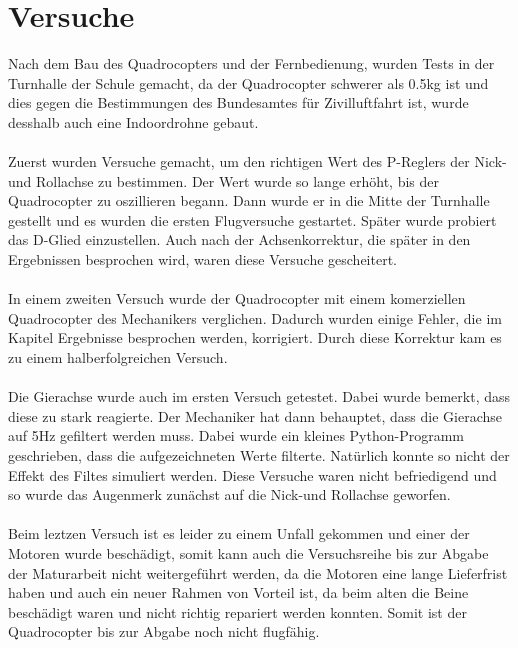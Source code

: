 \documentclass[12pt,a4paper, ngerman]{article}
\begin{document}
\section{Versuche}
Nach dem Bau des Quadrocopters und der Fernbedienung, wurden Tests in der Turnhalle der Schule gemacht, da der Quadrocopter schwerer als 0.5kg ist und dies gegen die Bestimmungen des Bundesamtes für Zivilluftfahrt ist, wurde desshalb auch eine Indoordrohne gebaut. \\ \\ Zuerst wurden Versuche gemacht, um den richtigen Wert des P-Reglers der Nick-und Rollachse zu bestimmen. Der Wert wurde so lange erhöht, bis der Quadrocopter zu oszillieren begann. Dann wurde er in die Mitte der Turnhalle gestellt und es wurden die ersten Flugversuche gestartet. Später wurde probiert das D-Glied einzustellen. Auch nach der Achsenkorrektur, die später in den Ergebnissen besprochen wird, waren diese Versuche gescheitert. \\ \\ In einem zweiten Versuch wurde der Quadrocopter mit einem komerziellen Quadrocopter des Mechanikers verglichen. Dadurch wurden einige Fehler, die im Kapitel 
Ergebnisse besprochen werden, korrigiert. Durch diese Korrektur kam es zu einem halberfolgreichen Versuch. \\ \\ Die Gierachse wurde auch im ersten Versuch getestet. Dabei wurde bemerkt, dass diese zu stark reagierte. Der Mechaniker hat dann behauptet, dass die Gierachse auf 5Hz gefiltert werden muss. Dabei wurde ein kleines Python-Programm geschrieben, dass die aufgezeichneten Werte filterte. Natürlich konnte so nicht der Effekt des Filtes simuliert werden. Diese Versuche waren nicht befriedigend und so wurde das Augenmerk zunächst auf die Nick-und Rollachse geworfen. \\ \\ Beim leztzen Versuch ist es leider zu einem Unfall gekommen und einer der Motoren wurde beschädigt, somit kann auch die Versuchsreihe bis zur Abgabe der Maturarbeit nicht weitergeführt werden, da die Motoren eine lange Lieferfrist haben und auch ein neuer Rahmen von Vorteil ist, da beim alten die Beine beschädigt waren und nicht richtig repariert werden konnten. Somit ist der Quadrocopter bis zur Abgabe noch nicht flugfähig. 
\newpage
\end{document}
